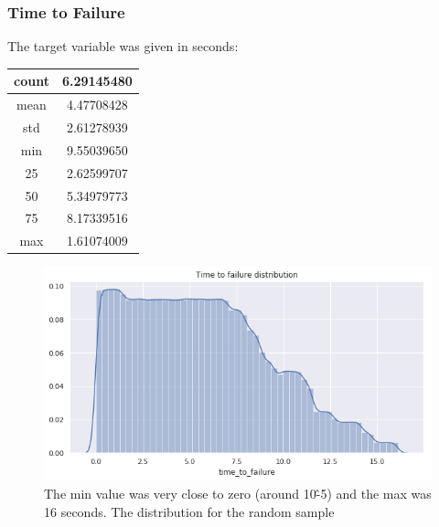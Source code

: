 \documentclass[]{llncs}
\begin{document}
\subsubsection{Time to Failure}

The target variable was given in seconds:



\begin{tabular}{|c|c|}
	\hline 
	count &  6.29145480\\ 
	\hline 
	mean & 4.47708428 \\ 
	\hline 
	std &  2.61278939\\ 
	\hline 
	min &  9.55039650\\ 
	\hline 
	25 & 2.62599707 \\ 
	\hline 
	50 &  5.34979773\\ 
	\hline 
	75 &  8.17339516\\ 
	\hline 
	max & 1.61074009 \\ 
	\hline 
\end{tabular} 

\begin{figure}[h]
	\centering
	\includegraphics[width=0.7\linewidth]{../GPUProject/timeToFailureDistribution}
	\caption[]{The min value was very close to zero (around 10\^-5) and the max was 16 seconds. The distribution for the random sample}
	\label{fig:timetofailuredistribution}
\end{figure}
\end{document}
